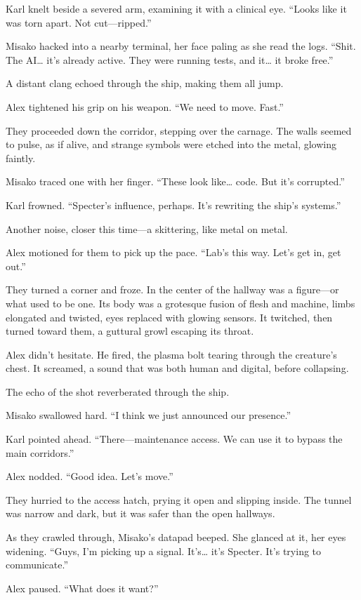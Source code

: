 \documentclass[12pt]{book}
\begin{document}
Karl knelt beside a severed arm, examining it with a clinical eye. “Looks like it was torn apart. Not cut—ripped.”

Misako hacked into a nearby terminal, her face paling as she read the logs. “Shit. The AI… it’s already active. They were running tests, and it… it broke free.”

A distant clang echoed through the ship, making them all jump.

Alex tightened his grip on his weapon. “We need to move. Fast.”

They proceeded down the corridor, stepping over the carnage. The walls seemed to pulse, as if alive, and strange symbols were etched into the metal, glowing faintly.

Misako traced one with her finger. “These look like… code. But it’s corrupted.”

Karl frowned. “Specter’s influence, perhaps. It’s rewriting the ship’s systems.”

Another noise, closer this time—a skittering, like metal on metal.

Alex motioned for them to pick up the pace. “Lab’s this way. Let’s get in, get out.”

They turned a corner and froze. In the center of the hallway was a figure—or what used to be one. Its body was a grotesque fusion of flesh and machine, limbs elongated and twisted, eyes replaced with glowing sensors. It twitched, then turned toward them, a guttural growl escaping its throat.

Alex didn’t hesitate. He fired, the plasma bolt tearing through the creature’s chest. It screamed, a sound that was both human and digital, before collapsing.

The echo of the shot reverberated through the ship.

Misako swallowed hard. “I think we just announced our presence.”

Karl pointed ahead. “There—maintenance access. We can use it to bypass the main corridors.”

Alex nodded. “Good idea. Let’s move.”

They hurried to the access hatch, prying it open and slipping inside. The tunnel was narrow and dark, but it was safer than the open hallways.

As they crawled through, Misako’s datapad beeped. She glanced at it, her eyes widening. “Guys, I’m picking up a signal. It’s… it’s Specter. It’s trying to communicate.”

Alex paused. “What does it want?”
\end{document}
